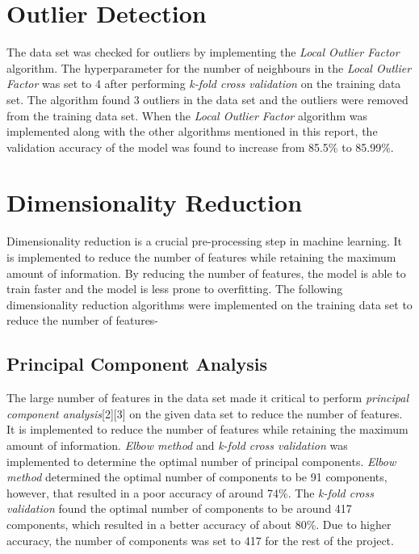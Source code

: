 \documentclass[conference]{IEEEtran}
\begin{document}
\section{Outlier Detection}
    The data set was checked for outliers by implementing the \textit{Local Outlier Factor} algorithm. The hyperparameter for the number of neighbours in the \textit{Local Outlier Factor} was set to 4 after performing \textit{k-fold cross validation} on the training data set. 
    The algorithm found 3 outliers in the data set and the outliers were removed from the training data set. When the \textit{Local Outlier Factor} algorithm was implemented along with the other algorithms mentioned in this report, the validation accuracy of the model was found to increase from 85.5\% to 85.99\%. 

\section{Dimensionality Reduction}
    Dimensionality reduction is a crucial pre-processing step in machine learning. It is implemented to reduce the number of features while retaining the maximum amount of information. By reducing the number of features, the model is able to train faster and the model is less prone to overfitting. The following dimensionality reduction algorithms were implemented on the training data set to reduce the number of features-
\subsection{Principal Component Analysis}
    The large number of features in the data set made it critical to perform \textit{principal component analysis}[2][3] on the given data set to reduce the number of features. It is implemented to reduce the number of features while retaining the maximum amount of information. \textit{Elbow method} and \textit{k-fold cross validation} was implemented to determine the optimal number of principal components. \textit{Elbow method} determined the optimal number of components to be 91 components, however, that resulted in a poor accuracy of around 74\%. 
    The \textit{k-fold cross validation} found the optimal number of components to be around 417 components, which resulted in a better accuracy of about 80\%.
    Due to higher accuracy, the number of components was set to 417 for the rest of the project.
\end{document}
